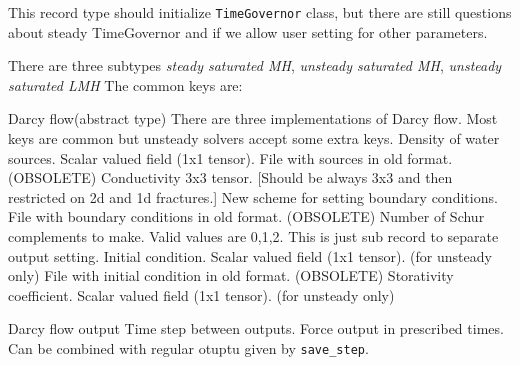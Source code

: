 This record type should initialize \verb'TimeGovernor' class, but there are still questions about steady TimeGovernor and 
if we allow user setting for other parameters.

There are three subtypes {\it steady saturated MH}, {\it unsteady saturated MH}, {\it unsteady saturated LMH}
The common keys are:

\begin{recordtype}{Darcy flow}{(abstract type)}
  There are three implementations of Darcy flow. Most keys are common but unsteady solvers accept some extra keys.
 Density of water sources. Scalar valued field (1x1 tensor).
File with sources in old format. (OBSOLETE)
%
Conductivity 3x3 tensor. [Should be always 3x3 and then restricted on 2d and 1d fractures.]
New scheme for setting boundary conditions.
File with boundary conditions in old format. (OBSOLETE)
%
Number of Schur complements to make. Valid values are 0,1,2.
%
This is just sub record to separate output setting. 
%
Initial condition. Scalar valued field (1x1 tensor). (for unsteady only)
File with initial condition in old format. (OBSOLETE)
%
Storativity coefficient. Scalar valued field (1x1 tensor). (for unsteady only)
\end{recordtype}

\begin{recordtype}{Darcy flow output}{}
Time step between outputs.
Force output in prescribed times. Can be combined with regular otuptu given by \verb'save_step'.
\end{recordtype}
 


